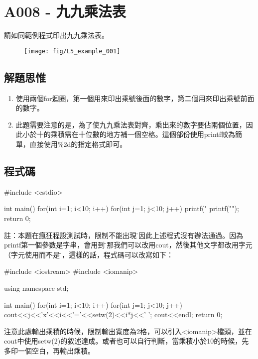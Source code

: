\section{A008 - 九九乘法表}
請如同範例程式印出九九乘法表。
\begin{figure}[H]
	\centering
	\texttt{[image: fig/L5\_example\_001]}
	\label{L5_example_001}
\end{figure}

\subsection{解題思惟}
\begin{enumerate}
	\item 使用兩個for迴圈，第一個用來印出乘號後面的數字，第二個用來印出乘號前面的數字。
	\item 此題需要注意的是，為了使九九乘法表對齊，乘出來的數字要佔兩個位置，因此小於十的乘積需在十位數的地方補一個空格。這個部份使用printf較為簡單，直接使用\%2d的指定格式即可。
\end{enumerate}

\subsection{程式碼}
\begin{cppcode}
	#include <cstdio>
	
	int main()
	{
		for(int i=1; i<10; i++) {
			for(int j=1; j<10; j++) {
				printf("%
			}
			printf("\n");
		}
		return 0;
	}
\end{cppcode}
註：本題在瘋狂程設測試時，限制不能出現\"，因此上述程式沒有辦法通過。因為printf第一個參數是字串，會用到\"，那我們可以改用cout，然後其他文字都改用字元（字元使用\'而不是\"），這樣的話，程式碼可以改寫如下：
\begin{inside}
	#include <iostream>
	#include <iomanip>
	
	using namespace std;
	
	int main()
	{
		for(int i=1; i<10; i++) {
			for(int j=1; j<10; j++) {
				cout<<j<<'x'<<i<<'='<<setw(2)<<i*j<<' ';
			}
			cout<<endl;
		}
		return 0;
	}
\end{inside}
注意此處輸出乘積的時候，限制輸出寬度為2格，可以引入<iomanip>檔頭，並在cout中使用setw(2)的敘述達成。或者也可以自行判斷，當乘積小於10的時候，先多印一個空白，再輸出乘積。
